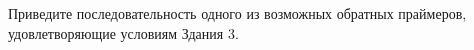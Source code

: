 
Приведите последовательность одного из возможных обратных праймеров, удовлетворяющие условиям Здания 3.